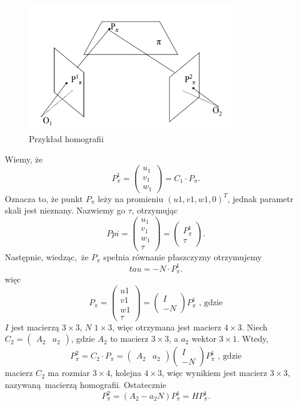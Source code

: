 \documentclass[12pt,twoside,polish]{article}
\begin{document}
\begin{figure}[h]
	\centering	
	\includegraphics[width=0.8\textwidth]{homography_img}
	\caption{Przykład homografii \cite{cameralib}}
	\label{homography_label}
\end{figure}

Wiemy, że
$$P^1_\pi = \begin{pmatrix} u_1 \\ v_1 \\ w_1 \end{pmatrix} = C_1 \cdot P_\pi \text{.}$$
Oznacza to, że punkt $P_\pi$ leży na promieniu $(u1,v1,w1,0)^T$, jednak parametr skali jest nieznany. Nazwiemy go $\tau$, otrzymując
$$ Ppi = \begin{pmatrix} u_1 \\ v_1 \\ w_1\\ \tau \end{pmatrix} = \begin{pmatrix}P^1_\pi \\ \tau \end{pmatrix} \text{.}$$
Następnie, wiedząc, że $P_\pi$ spełnia równanie płaszczyzny otrzymujemy
$$ tau = -N \cdot P^1_\pi  \text{.}$$
więc
$$ P_\pi = \begin{pmatrix} u1 \\ v1 \\ w1 \\ \tau \end{pmatrix} = \begin{pmatrix} I \\-N \end{pmatrix} P^1_\pi  \text{ , gdzie}$$
$I$ jest macierzą $3 \times 3$, $N$ $1 \times 3$, więc otrzymana jest macierz $4 \times 3$.
Niech $C_2 = \begin{pmatrix} A_2 & a_2\end{pmatrix}$, gdzie $A_2$ to macierz $3\times 3$, a $a_2$ wektor $3 \times 1$. Wtedy,
$$ P^2_\pi = C_2 \cdot P_\pi = \begin{pmatrix} A_2 & a_2\end{pmatrix} \begin{pmatrix}I \\ -N \end{pmatrix} P^1_\pi  \text{ , gdzie}$$
macierz $C_2$ ma rozmiar $3 \times 4$, kolejna $4 \times 3$, więc wynikiem jest macierz $3 \times 3$, nazywaną macierzą homografii. Ostatecznie
$$P^2_\pi = (A_2-a_2 N)P^1_\pi = HP^1_\pi \text{.}$$
\end{document}
